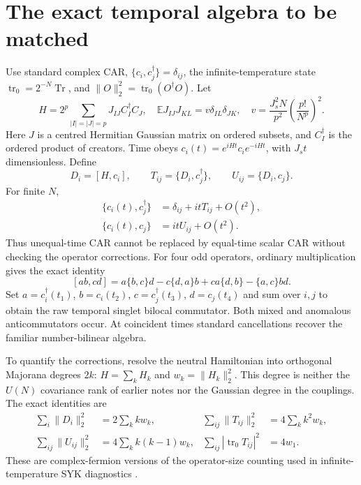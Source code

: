 \documentclass[11pt,a4paper]{article}
\newcommand{\trn}{\operatorname{tr}_0}
\newcommand{\EE}{\mathbb E}
\begin{document}
\section{The exact temporal algebra to be matched}
Use standard complex CAR, $\{c_i,c_j^\dagger\}=\delta_{ij}$,
the infinite-temperature state $\trn=2^{-N}\operatorname{Tr}$,
and $\|O\|_2^2=\trn(O^\dagger O)$. Let
\begin{equation}
 H=2^p\sum_{|I|=|J|=p}J_{IJ}C_I^\dagger C_J,
 \quad \EE J_{IJ}J_{KL}=v\delta_{IL}\delta_{JK},\quad
 v=\frac{J_s^2N}{p^2}\left(\frac{p!}{N^p}\right)^2.
\end{equation}
Here $J$ is a centred Hermitian Gaussian matrix on ordered subsets,
and $C_I^\dagger$ is the ordered product of creators. Time obeys
$c_i(t)=e^{iHt}c_i e^{-iHt}$, with $J_st$ dimensionless.
Define
\begin{equation}
 D_i=[H,c_i],\qquad T_{ij}=\{D_i,c_j^\dagger\},\qquad
 U_{ij}=\{D_i,c_j\}.
\end{equation}
For finite $N$,
\begin{align}
 \{c_i(t),c_j^\dagger\}&=\delta_{ij}+itT_{ij}+O(t^2),\\
 \{c_i(t),c_j\}&=itU_{ij}+O(t^2).
\end{align}
Thus unequal-time CAR cannot be replaced by equal-time scalar CAR
without checking the operator corrections. For four odd operators,
ordinary multiplication gives the exact identity
\begin{equation}\label{eq:four}
 [ab,cd]=a\{b,c\}d-c\{d,a\}b+ca\{d,b\}-\{a,c\}bd.
\end{equation}
Set $a=c_i^\dagger(t_1)$, $b=c_i(t_2)$,
$c=c_j^\dagger(t_3)$, $d=c_j(t_4)$ and sum over $i,j$ to obtain
the raw temporal singlet bilocal commutator. Both mixed and anomalous
anticommutators occur. At coincident times standard cancellations
recover the familiar number-bilinear algebra.

To quantify the corrections, resolve the neutral Hamiltonian into
orthogonal Majorana degrees $2k$: $H=\sum_k H_k$ and
$w_k=\|H_k\|_2^2$. This degree is neither the $U(N)$ covariance
rank of earlier notes nor the Gaussian degree in the couplings.
The exact identities are
\begin{align}\label{eq:norms}
 \sum_i\|D_i\|_2^2&=2\sum_k k w_k,&
 \sum_{ij}\|T_{ij}\|_2^2&=4\sum_k k^2w_k,\\
 \sum_{ij}\|U_{ij}\|_2^2&=4\sum_k k(k-1)w_k,&
 \sum_{ij}|\trn T_{ij}|^2&=4w_1.\nonumber
\end{align}
These are complex-fermion versions of the operator-size counting
used in infinite-temperature SYK diagnostics \cite{RSS}.
\end{document}
